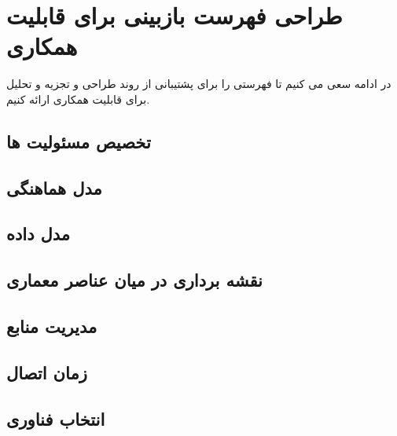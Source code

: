 \section{طراحی فهرست بازبینی برای قابلیت همکاری}

در ادامه سعی می کنیم تا فهرستی را برای پشتیبانی از روند طراحی و تجزیه و تحلیل برای قابلیت همکاری ارائه کنیم.


\subsection{تخصیص مسئولیت ها} 
\subsection{مدل هماهنگی}
\subsection{مدل داده}
\subsection{نقشه برداری در میان عناصر معماری}
\subsection{مدیریت منابع}
\subsection{زمان اتصال}
\subsection{انتخاب فناوری}








